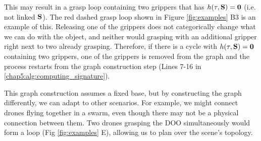 This may result in a grasp loop containing two grippers that has $h(\tau,\textbf{S})=\bm{0}$ (i.e. not linked $\textbf{S}$). The red dashed grasp loop shown in Figure \ref{fig:examples} B3 is an example of this. Releasing one of the grippers does not categorically change what we can do with the object, and neither would grasping with an additional gripper right next to two already grasping. Therefore, if there is a cycle with $h(\tau,\textbf{S})=\bm{0}$ containing two grippers, one of the grippers is removed from the graph and the process restarts from the graph construction step (Lines 7-16 in \ref{chap5:alg:computing_signature}).

This graph construction assumes a fixed base, but by constructing the graph differently, we can adapt to other scenarios. For example, we might connect drones flying together in a swarm, even though there may not be a physical connection between them. Two drones grasping the DOO simultaneously would form a loop (Fig \ref{fig:examples} E), allowing us to plan over the scene's topology.


